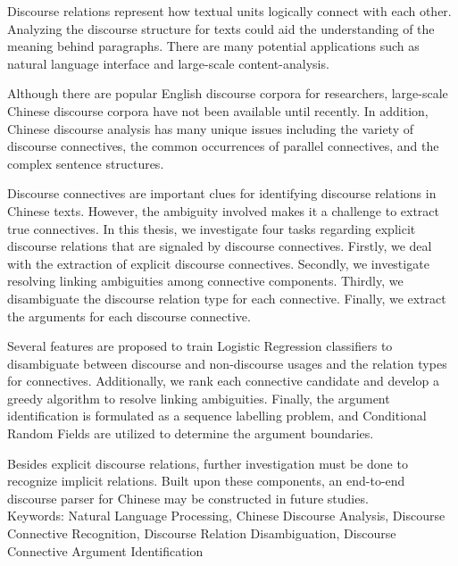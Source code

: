\begin{abstracten}

Discourse relations represent how textual units logically connect
with each other. Analyzing the discourse structure for texts
could aid the understanding of the meaning behind paragraphs.
There are many potential applications such as natural language
interface and large-scale content-analysis.

Although there are popular English discourse corpora for researchers,
large-scale Chinese discourse corpora have not been available until
recently. In addition, Chinese discourse analysis has many
unique issues including the variety of discourse connectives,
the common occurrences of parallel connectives, and the complex
sentence structures.

Discourse connectives are important clues for identifying discourse
relations in Chinese texts. However, the ambiguity involved makes
it a challenge to extract true connectives. In this thesis, we investigate
four tasks regarding explicit discourse relations that are signaled
by discourse connectives. Firstly, we deal with the extraction
of explicit discourse connectives. Secondly, we investigate resolving
linking ambiguities among connective components.
Thirdly, we disambiguate the discourse relation type for each connective.
Finally, we extract the arguments for each discourse connective.

Several features are proposed to train Logistic Regression classifiers
to disambiguate between discourse and non-discourse usages and
the relation types for connectives. Additionally, we rank each
connective candidate and develop a greedy algorithm to resolve
linking ambiguities. Finally, the argument identification is formulated
as a sequence labelling problem, and Conditional Random Fields are
utilized to determine the argument boundaries.

Besides explicit discourse relations, further investigation must be done
to recognize implicit relations. Built upon these components,
an end-to-end discourse parser for Chinese may be constructed
in future studies. \\

\noindent
Keywords: Natural Language Processing, Chinese Discourse Analysis,
Discourse Connective Recognition, Discourse Relation Disambiguation,
Discourse Connective Argument Identification
\end{abstracten}

